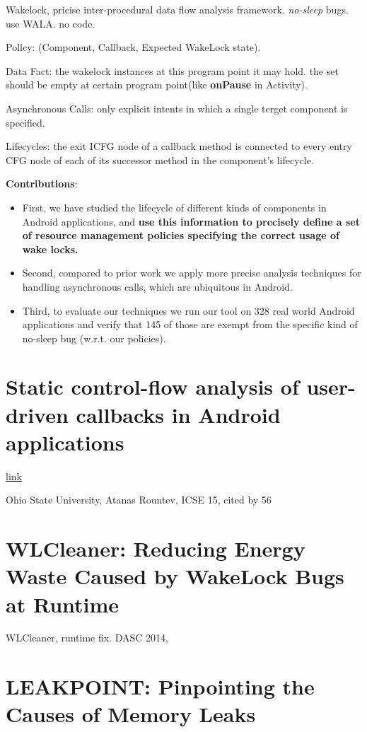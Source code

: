 \documentclass{article}
\begin{document}
Wakelock, pricise inter-procedural data flow analysis framework. \emph{no-sleep}
bugs. use WALA. no code. 

Pollcy: (Component, Callback, Expected WakeLock state). 

Data Fact: the wakelock instances at this program point it may hold. the set
should be empty at certain program point(like \textbf{onPause} in Activity).

Asynchronous Calls: only explicit intents in which a single terget component is
specified.

Lifecycles: the exit ICFG node of a callback method is connected to every entry
CFG node of each of its successor method in the component’s lifecycle.


\textbf{Contributions}:
\begin{itemize}
\item First, we have studied the lifecycle of different kinds of components in
  Android applications, and \textbf{use this information to precisely define a
    set of resource management policies specifying the correct usage of wake
    locks.}
\item Second, compared to prior work we apply more precise analysis techniques
  for handling asynchronous calls, which are ubiquitous in Android.
\item Third, to evaluate our techniques we run our tool on 328 real world
  Android applications and verify that 145 of those are exempt from the specific
  kind of no-sleep bug (w.r.t. our policies).
\end{itemize}


\section{Static control-flow analysis of user-driven callbacks in Android
  applications}

\href{http://dl.acm.org/citation.cfm?id=2818768}{link}

Ohio State University, Atanas Rountev, ICSE 15, cited by 56


\section{WLCleaner: Reducing Energy Waste Caused by WakeLock Bugs at Runtime}

WLCleaner, runtime fix. DASC 2014,


\section{LEAKPOINT: Pinpointing the Causes of Memory Leaks}
\end{document}
